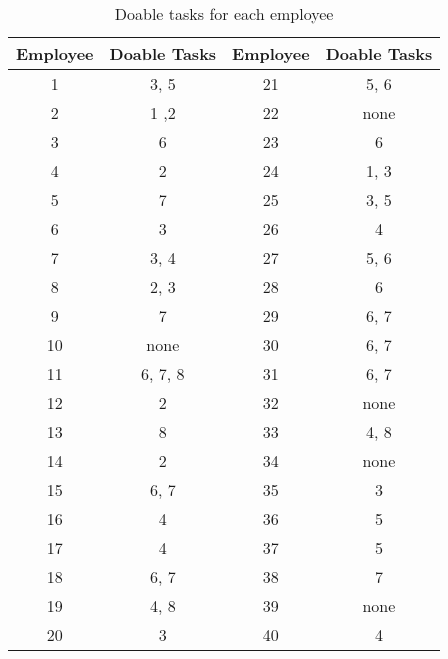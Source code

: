 \begin{table}[H]
	\centering
	\caption{Doable tasks for each employee}
	\begin{tabular}{cc||cc}\hline
Employee & Doable Tasks & Employee & Doable Tasks \\ \hline
1 & 3, 5 & 21 & 5, 6 \\
2 & 1 ,2 & 22 & none \\
3 & 6 & 23 & 6 \\
4 & 2 & 24 & 1, 3 \\
5 & 7 & 25 & 3, 5 \\
6 & 3 & 26 & 4 \\
7 & 3, 4 & 27 & 5, 6 \\
8 & 2, 3 & 28 & 6 \\
9 & 7 & 29 & 6, 7 \\
10 & none & 30 & 6, 7 \\
11 & 6, 7, 8 & 31 & 6, 7 \\
12 & 2 & 32 & none \\
13 & 8 & 33 & 4, 8 \\
14 & 2 & 34 & none \\
15 & 6, 7 & 35 & 3 \\
16 & 4 & 36 & 5 \\
17 & 4 & 37 & 5 \\
18 & 6, 7 & 38 & 7 \\
19 & 4, 8 & 39 & none \\
20 & 3 & 40 & 4 \\ \hline
	\end{tabular}
	\label{doable-tasks}
\end{table}

